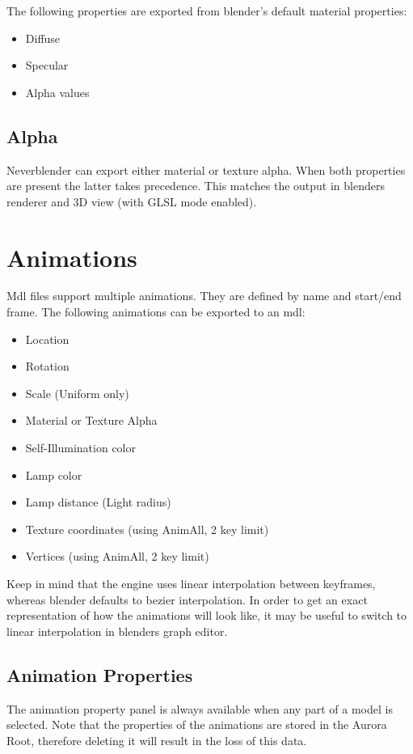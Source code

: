 The following properties are exported from blender's default material properties:
\begin{itemize}
    \item Diffuse
    \item Specular
    \item Alpha values
\end{itemize}

\subsection*{Alpha}
Neverblender can export either material or texture alpha. When both properties are present 
the latter takes precedence. This matches the output in blenders renderer 
and 3D view (with GLSL mode enabled).

\section{Animations}
Mdl files support multiple animations. They are defined by name and start/end frame.
The following animations can be exported to an mdl:
\begin{itemize}
    \item Location
    \item Rotation
    \item Scale (Uniform only)
    \item Material or Texture Alpha
    \item Self-Illumination color
    \item Lamp color
    \item Lamp distance (Light radius)
    \item Texture coordinates (using AnimAll, 2 key limit)
    \item Vertices (using AnimAll, 2 key limit)
\end{itemize}
Keep in mind that the engine uses linear interpolation between keyframes, whereas blender 
defaults to bezier interpolation. In order to get an exact representation of how the animations will 
look like, it may be useful to switch to linear interpolation in blenders graph editor.

\subsection{Animation Properties}


\begin{minipage}[t]{0.55\textwidth}
    The animation property panel is always available when any part of a model is selected. Note 
    that the properties of the animations are stored in the Aurora Root, therefore deleting it 
    will result in the loss of this data.
\end{minipage}\hfill
\begin{minipage}[t]{0.4\textwidth}
    \centering{}
    \label{fig1}
\end{minipage}


